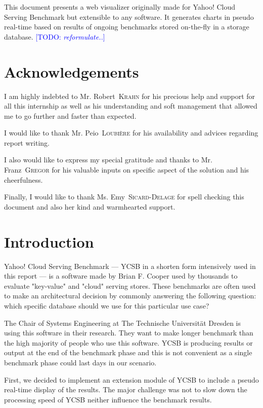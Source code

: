 \documentclass[a4paper,11pt]{report}
\newcommand*{\auteur}[2]{\large #1~\textsc{#2}} %
\newcommand*{\todo}[1]{\textcolor{blue}{[TODO: \emph{#1}]}}
\begin{document}
This document presents a web visualizer originally made for Yahoo! Cloud Serving Benchmark but extensible to any software. It generates charts in pseudo real-time based on results of ongoing benchmarks stored on-the-fly in a storage database. \todo{reformulate..}

\tableofcontents

\newpage

\listoffigures  %

\newpage
\chapter*{Acknowledgements}

I am highly indebted to Mr. \auteur{Robert}{Krahn} for his precious help and support for all this internship as well as his understanding and soft management that allowed me to go further and faster than expected.

I would like to thank Mr. \auteur{Peio}{Loubière} for his availability and advices regarding report writing.

I also would like to express my special gratitude and thanks to Mr. \auteur{Franz}{Gregor} for his valuable inputs on specific aspect of the solution and his cheerfulness.

Finally, I would like to thank Ms. \auteur{Emy}{Sicard-Delage} for spell checking this document and also her kind and warmhearted support.

\chapter*{Introduction}

Yahoo! Cloud Serving Benchmark --- YCSB in a shorten form intensively used in this report --- is a software made by Brian F. Cooper \cite{ycsb:repo} used by thousands to evaluate "key-value" and "cloud" serving stores. These benchmarks are often used to make an architectural decision by commonly answering the following question: which specific database should we use for this particular use case?

The Chair of Systems Engineering at The Technische Universität Dresden is using this software in their research. They want to make longer benchmark than the high majority of people who use this software. YCSB is producing results or output at the end of the benchmark phase and this is not convenient as a single benchmark phase could last days in our scenario.

First, we decided to implement an extension module of YCSB to include a pseudo real-time display of the results. The major challenge was not to slow down the processing speed of YCSB neither influence the benchmark results. 
\end{document}
